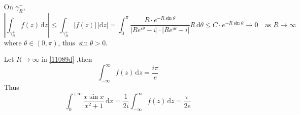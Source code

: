 On $\gamma^{+}_{R}$,
\[
\left\lvert  \int_{\gamma^{+}_{R}}^{} f(z) \, \mathrm{d}z   \right\rvert \leq \int_{\gamma^{+}_{R}}^{} \lvert f(z) \rvert  \, \lvert \mathrm{d}z \rvert  =\int_{0}^{\pi} \frac{R\cdot e^{ -R \sin\theta }}{\lvert R e^{ i\theta }-i \rvert \cdot \lvert R e^{ i\theta }+i \rvert } R \, \mathrm{d}\theta\leq C\cdot e^{ -R\sin\theta }\to0\quad \text{as }R\to \infty
\]
where $\theta\in(0,\pi)$, thus $\sin\theta>0$.

Let $R\to \infty$ in \cref{11089d} ,then
\[
\int_{-\infty}^{\infty } f(z)  \, \mathrm{d}z=\frac{i\pi}{e}
\]
Thus
\[
\int_{0}^{+\infty} \frac{x\sin x}{x^2+1} \, \mathrm{d}x =\frac{1}{2i}\int_{-\infty }^{\infty} f(z) \, \mathrm{d}z=\frac{\pi}{2e}
\]